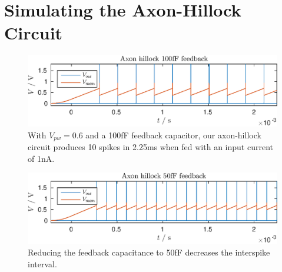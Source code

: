 

\newcommand{\reffig}[1]{Fig.~\ref{#1}}



\newpage
\section{Simulating the Axon-Hillock Circuit}
\begin{figure}
    \center
    \includegraphics{fig1.eps}
    \caption{With \(V_{pw}=0.6\) and a 100fF feedback capacitor, our axon-hillock circuit produces 10 spikes in 2.25ms when
    fed with an input current of 1nA.}
    \label{fig:1}
\end{figure}
\begin{figure}
    \center
    \includegraphics{fig2.eps}
    \caption{Reducing the feedback capacitance to 50fF decreases the interspike interval.}
    \label{fig:2}
\end{figure}
